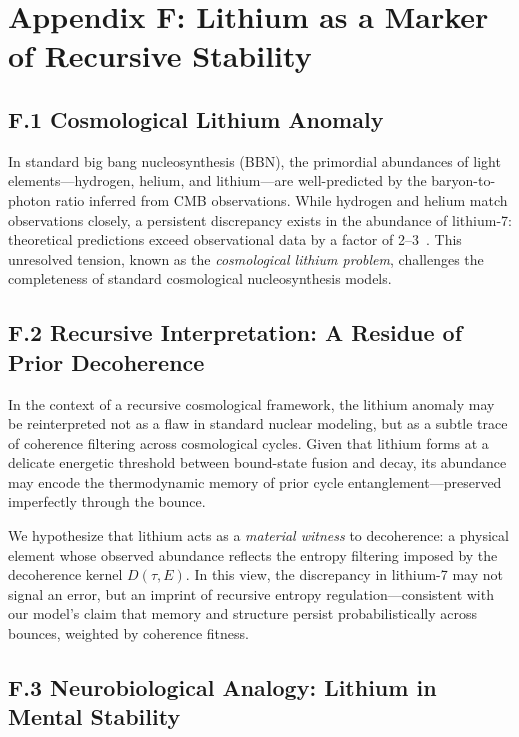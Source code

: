 \section*{Appendix F: Lithium as a Marker of Recursive Stability}

\subsection*{F.1 Cosmological Lithium Anomaly}

In standard big bang nucleosynthesis (BBN), the primordial abundances of light elements—hydrogen, helium, and lithium—are well-predicted by the baryon-to-photon ratio inferred from CMB observations. While hydrogen and helium match observations closely, a persistent discrepancy exists in the abundance of lithium-7: theoretical predictions exceed observational data by a factor of 2–3~\cite{fields2020bbn}. This unresolved tension, known as the \textit{cosmological lithium problem}, challenges the completeness of standard cosmological nucleosynthesis models.

\subsection*{F.2 Recursive Interpretation: A Residue of Prior Decoherence}

In the context of a recursive cosmological framework, the lithium anomaly may be reinterpreted not as a flaw in standard nuclear modeling, but as a subtle trace of coherence filtering across cosmological cycles. Given that lithium forms at a delicate energetic threshold between bound-state fusion and decay, its abundance may encode the thermodynamic memory of prior cycle entanglement—preserved imperfectly through the bounce.

We hypothesize that lithium acts as a \textit{material witness} to decoherence: a physical element whose observed abundance reflects the entropy filtering imposed by the decoherence kernel \( D(\tau, E) \). In this view, the discrepancy in lithium-7 may not signal an error, but an imprint of recursive entropy regulation—consistent with our model’s claim that memory and structure persist probabilistically across bounces, weighted by coherence fitness.

\subsection*{F.3 Neurobiological Analogy: Lithium in Mental Stability}

